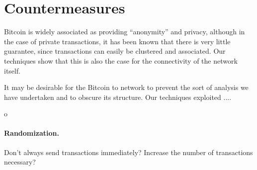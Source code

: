 \section{Countermeasures}
Bitcoin is widely associated as providing ``anonymity'' and privacy, although in the case of private transactions, it has been known that there is very little guarantee, since transactions can easily be clustered and associated. Our techniques show that this is also the case for the connectivity of the network itself.

It may be desirable for the Bitcoin to network to prevent the sort of analysis we have undertaken and to obscure its structure. Our techniques exploited .... 

o

\paragraph{Randomization.}
Don't always send transactions immediately? Increase the number of transactions necessary?
